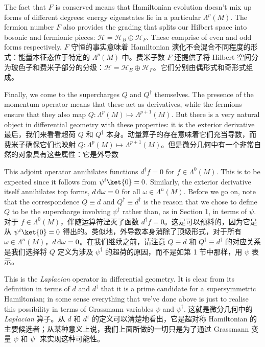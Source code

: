 \documentclass{ctexart}
\begin{document}
\begin{paracol}{2}
The fact that $F$ is conserved means that Hamiltonian evolution doesn’t mix up forms of different degrees: energy eigenstates lie in a particular $\Lambda^{p}(M)$. The fermion number $F$ also provides the grading that splits our Hilbert space into bosonic and fermionic pieces: $\mathcal{H} = \mathcal{H}_B \oplus \mathcal{H}_F$. These comprise of even and odd forms respectively.
\switchcolumn
$F$ 守恒的事实意味着 Hamiltonian 演化不会混合不同程度的形式：能量本征态位于特定的 $\Lambda^{p}(M)$ 中。费米子数 $F$ 还提供了将 Hilbert 空间分为玻色子和费米子部分的分级：$\mathcal{H} = \mathcal{H}_B \oplus \mathcal{H}_F$。它们分别由偶形式和奇形式组成。
\switchcolumn*

Finally, we come to the supercharges $Q$ and $Q^{\dagger}$ themselves. The presence of the momentum operator means that these act as derivatives, while the fermions ensure that they also map $Q: \Lambda^p(M) \mapsto \Lambda^{p + 1}(M)$. But there is a very natural object in differential geometry with these properties: it is the exterior derivative
\switchcolumn
最后，我们来看看超荷 $Q$ 和 $Q^{\dagger}$ 本身。动量算子的存在意味着它们充当导数，而费米子确保它们也映射 $Q: \Lambda^p(M) \mapsto \Lambda^{p + 1}(M)$。但是微分几何中有一个非常自然的对象具有这些属性：它是外导数
\switchcolumn*

This adjoint operator annihilates functions $d^{\dagger} f = 0$ for $f \in \Lambda^0(M)$. This is to be expected since it follows from $\psi^i \ket{0} = 0$. Similarly, the exterior derivative itself annihilates top forms, $d\odif{\omega} = 0$ for all $\omega \in \Lambda^n(M)$. Before we go on, note that the correspondence $Q \equiv d$ and $Q^{\dagger} \equiv d^{\dagger}$ is the reason that we chose to define $Q$ to be the supercharge involving $\psi^{\dagger}$ rather than, as in Section 1, in terms of $\psi$.
\switchcolumn
对于 $f \in \Lambda^0(M)$，伴随运算符湮灭了函数 $d^{\dagger} f = 0$。这是可以预料的，因为它是从 $\psi^i \ket{0} = 0$ 得出的。类似地，外导数本身消除了顶级形式，对于所有 $\omega \in \Lambda^n(M)$，$d\odif{\omega} = 0$。在我们继续之前，请注意 $Q \equiv d$ 和 $Q^{\dagger} \equiv d^{\dagger}$ 的对应关系是我们选择将 $Q$ 定义为涉及 $\psi^{\dagger}$ 的超荷的原因，而不是如第 1 节中那样，用 $\psi$ 表示。
\switchcolumn*

This is the \textit{Laplacian} operator in differential geometry. It is clear from its definition in terms of $d$ and $d^{\dagger}$ that it is a prime candidate for a supersymmetric Hamiltonian; in some sense everything that we’ve done above is just to realise this possibility in terms of Grassmann variables $\psi$ and $\psi^{\dagger}$.
\switchcolumn
这就是微分几何中的 \textit{Laplacian} 算子。从 $d$ 和 $d^{\dagger}$ 的定义可以清楚地看出，它是超对称 Hamiltonian 的主要候选者；从某种意义上说，我们上面所做的一切只是为了通过 Grassmann 变量 $\psi$ 和 $\psi^{\dagger}$ 来实现这种可能性。
\switchcolumn*


\end{paracol}
\end{document}

